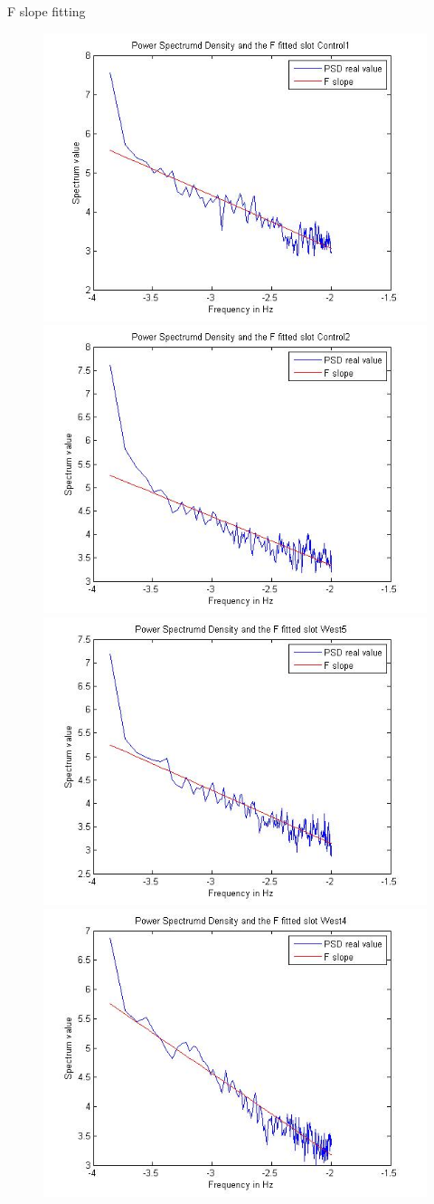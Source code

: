 \documentclass[t,12pt,english
\ifx\beamermode\undefined\else,\beamermode\fi
]{beamer}
\begin{document}
\begin{frame}{F slope fitting}
\begin{figure}[!htbp]
%
\centering
\includegraphics[width=.7\textwidth]{E33.jpg}\\
\includegraphics[width=.7\textwidth]{E34.jpg}\\
\endminipage\hfill
{}%
\centering
\includegraphics[width=.7\textwidth]{E38.jpg}\\
\includegraphics[width=.7\textwidth]{E39.jpg}\\

\end{figure}
\end{frame}
\end{document}
